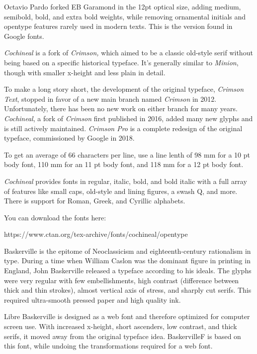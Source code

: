 Octavio Pardo forked EB Garamond in the 12pt optical size, adding medium, semibold, bold, and extra bold weights, while removing ornamental initials and opentype features rarely used in modern texts. This is the version found in Google fonts.

%
%

{\it Cochineal} is a fork of {\it Crimson,} which aimed to be a classic old-style serif without being based on a specific historical typeface. It’s generally similar to {\it Minion}, though with smaller x-height and less plain in detail.

To make a long story short, the development of the original typeface, {\it Crimson Text}, stopped in favor of a new main branch named {\it Crimson} in 2012. Unfortunately, there has been no new work on either branch for many years.  {\it Cochineal}, a fork of {\it Crimson} first published in 2016, added many new glyphs and is still actively maintained. {\it Crimson Pro} is a complete redesign of the original typeface, commissioned by Google in 2018.

To get an average of 66 characters per line, use a line lenth of 98 mm for a 10 pt body font, 110 mm for an 11 pt body font, and 118 mm for a 12 pt body font.

{\it Cochineal} provides fonts in regular, italic, bold, and bold italic with a full array of features like small caps, old-style and lining figures, a swash Q, and more. There is support for Roman, Greek, and Cyrillic alphabets.

You can download the fonts here:  

https://www.ctan.org/tex-archive/fonts/cochineal/opentype

%
%

Baskerville is the epitome of Neoclassicism and eighteenth-century rationalism in type. During a time when William Caslon was the dominant figure in printing in England, John Baskerville released a typeface according to his ideals. The glyphs were very regular with few embellishments, high contrast (difference between thick and thin strokes), almost vertical axis of stress, and sharply cut serifs. This required ultra-smooth pressed paper and high quality ink. 

Libre Baskerville is designed as a web font and therefore optimized for computer screen use. With increased x-height, short ascenders, low contrast, and thick serifs, it moved away from the original typeface idea. BaskervilleF is based on this font, while undoing the transformations required for a web font.

